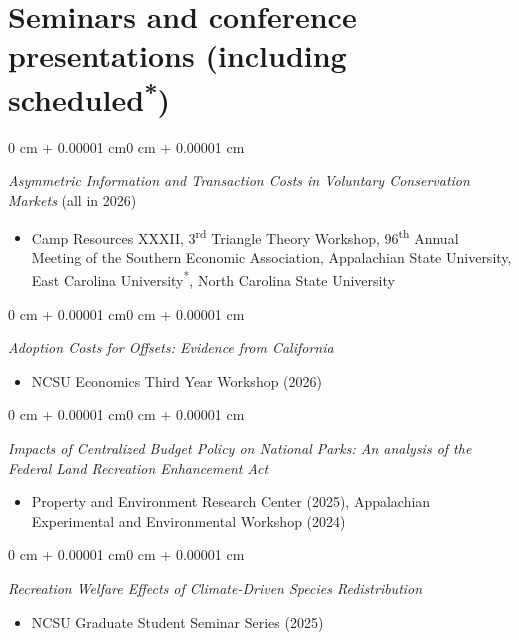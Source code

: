 \documentclass[12pt]{article}
\newenvironment{highlights}{
	\begin{itemize}[
		topsep=0.10 cm,
		partopsep=0pt,
		leftmargin=0.3 cm + 10pt,
		label={}
		]
	\setlength{\parsep}{0.10cm}\setlength{\itemsep}{0pt}
	}{
	\end{itemize}
}
\newenvironment{onecolentry}{
	\begin{adjustwidth}{0 cm + 0.00001 cm}{0 cm + 0.00001 cm}
	}
	{
	\end{adjustwidth}
}
\newcommand{\Star}[1]{#1\textsuperscript{*}}
\begin{document}
\section{Seminars and conference presentations (including \texorpdfstring{\Star{scheduled}}{scheduled*})}

\begin{onecolentry}
    \emph{Asymmetric Information and Transaction Costs in Voluntary Conservation Markets} (all in 2026)
    \begin{highlights}
        \item \small Camp Resources XXXII, 3\textsuperscript{rd} Triangle Theory Workshop, 96\textsuperscript{th} Annual Meeting of the Southern Economic Association, Appalachian State University, \texorpdfstring{\Star{East Carolina University}}{East Carolina University}, North Carolina State University
    \end{highlights}
\end{onecolentry}

\vspace{0.1cm}

\begin{onecolentry}
    \emph{Adoption Costs for Offsets: Evidence from California}
    \begin{highlights}
        \item \small NCSU Economics Third Year Workshop (2026)
    \end{highlights}
\end{onecolentry}

\vspace{0.1cm}

\begin{onecolentry}
    \emph{Impacts of Centralized Budget Policy on National Parks: An analysis of the Federal Land Recreation Enhancement Act}
    \begin{highlights}
        \item \small Property and Environment Research Center (2025), Appalachian Experimental and Environmental Workshop (2024)
    \end{highlights}
\end{onecolentry}

\vspace{0.1cm}

\begin{onecolentry}
    \emph{Recreation Welfare Effects of Climate-Driven Species Redistribution}
    \begin{highlights}
        \item \small NCSU Graduate Student Seminar Series (2025)
    \end{highlights}
\end{onecolentry}
\end{document}
